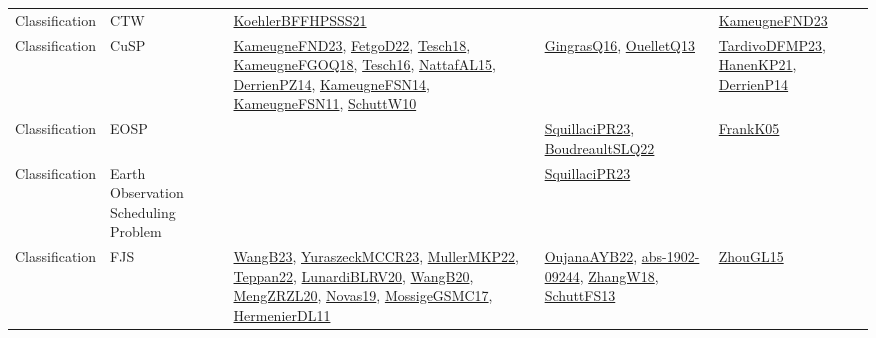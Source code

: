 {\begin{longtable}{lp{3cm}>{\raggedright}p{6cm}>{\raggedright}p{6cm}p{8cm}}
Classification & CTW & \href{articles/KoehlerBFFHPSSS21.pdf}{KoehlerBFFHPSSS21}\cite{KoehlerBFFHPSSS21} &  & \href{papers/KameugneFND23.pdf}{KameugneFND23}\cite{KameugneFND23}\\
Classification & CuSP & \href{papers/KameugneFND23.pdf}{KameugneFND23}\cite{KameugneFND23}, \href{articles/FetgoD22.pdf}{FetgoD22}\cite{FetgoD22}, \href{papers/Tesch18.pdf}{Tesch18}\cite{Tesch18}, \href{papers/KameugneFGOQ18.pdf}{KameugneFGOQ18}\cite{KameugneFGOQ18}, \href{papers/Tesch16.pdf}{Tesch16}\cite{Tesch16}, \href{articles/NattafAL15.pdf}{NattafAL15}\cite{NattafAL15}, \href{papers/DerrienPZ14.pdf}{DerrienPZ14}\cite{DerrienPZ14}, \href{articles/KameugneFSN14.pdf}{KameugneFSN14}\cite{KameugneFSN14}, \href{papers/KameugneFSN11.pdf}{KameugneFSN11}\cite{KameugneFSN11}, \href{papers/SchuttW10.pdf}{SchuttW10}\cite{SchuttW10} & \href{papers/GingrasQ16.pdf}{GingrasQ16}\cite{GingrasQ16}, \href{papers/OuelletQ13.pdf}{OuelletQ13}\cite{OuelletQ13} & \href{papers/TardivoDFMP23.pdf}{TardivoDFMP23}\cite{TardivoDFMP23}, \href{papers/HanenKP21.pdf}{HanenKP21}\cite{HanenKP21}, \href{papers/DerrienP14.pdf}{DerrienP14}\cite{DerrienP14}\\
Classification & EOSP &  & \href{papers/SquillaciPR23.pdf}{SquillaciPR23}\cite{SquillaciPR23}, \href{papers/BoudreaultSLQ22.pdf}{BoudreaultSLQ22}\cite{BoudreaultSLQ22} & \href{papers/FrankK05.pdf}{FrankK05}\cite{FrankK05}\\
Classification & Earth Observation Scheduling Problem &  & \href{papers/SquillaciPR23.pdf}{SquillaciPR23}\cite{SquillaciPR23} & \\
Classification & FJS & \href{papers/WangB23.pdf}{WangB23}\cite{WangB23}, \href{articles/YuraszeckMCCR23.pdf}{YuraszeckMCCR23}\cite{YuraszeckMCCR23}, \href{articles/MullerMKP22.pdf}{MullerMKP22}\cite{MullerMKP22}, \href{papers/Teppan22.pdf}{Teppan22}\cite{Teppan22}, \href{articles/LunardiBLRV20.pdf}{LunardiBLRV20}\cite{LunardiBLRV20}, \href{papers/WangB20.pdf}{WangB20}\cite{WangB20}, \href{articles/MengZRZL20.pdf}{MengZRZL20}\cite{MengZRZL20}, \href{articles/Novas19.pdf}{Novas19}\cite{Novas19}, \href{papers/MossigeGSMC17.pdf}{MossigeGSMC17}\cite{MossigeGSMC17}, \href{papers/HermenierDL11.pdf}{HermenierDL11}\cite{HermenierDL11} & \href{papers/OujanaAYB22.pdf}{OujanaAYB22}\cite{OujanaAYB22}, \href{articles/abs-1902-09244.pdf}{abs-1902-09244}\cite{abs-1902-09244}, \href{articles/ZhangW18.pdf}{ZhangW18}\cite{ZhangW18}, \href{papers/SchuttFS13.pdf}{SchuttFS13}\cite{SchuttFS13} & \href{papers/ZhouGL15.pdf}{ZhouGL15}\cite{ZhouGL15}\\

\end{longtable}}
